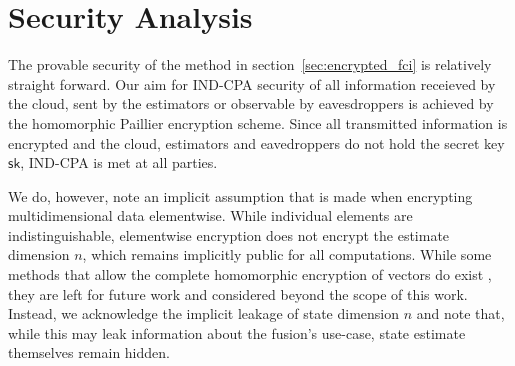 \documentclass[letterpaper, 10 pt, conference]{ieeeconf}
\begin{document}
\section{Security Analysis}\label{sec:security}
The provable security of the method in section~\ref{sec:encrypted_fci} is relatively straight forward. Our aim for IND-CPA security of all information receieved by the cloud, sent by the estimators or observable by eavesdroppers is achieved by the homomorphic Paillier encryption scheme. Since all transmitted information is encrypted and the cloud, estimators and eavedroppers do not hold the secret key $\mathsf{sk}$, IND-CPA is met at all parties.

We do, however, note an implicit assumption that is made when encrypting multidimensional data elementwise. While individual elements are indistinguishable, elementwise encryption does not encrypt the estimate dimension $n$, which remains implicitly public for all computations. While some methods that allow the complete homomorphic encryption of vectors do exist \cite{alexandruPrivateWeightedSum2020}, they are left for future work and considered beyond the scope of this work. Instead, we acknowledge the implicit leakage of state dimension $n$ and note that, while this may leak information about the fusion's use-case, state estimate themselves remain hidden.

% 
%                                 
%                                 
%                                 
% 
\end{document}

